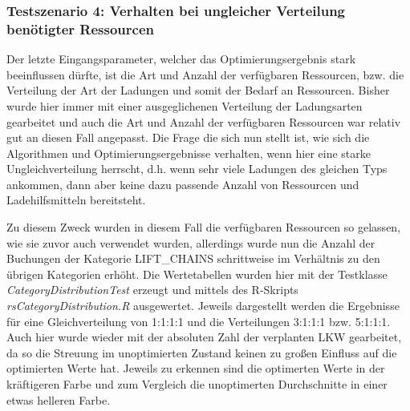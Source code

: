 \subsubsection{Testszenario 4: Verhalten bei ungleicher Verteilung benötigter Ressourcen}

Der letzte Eingangsparameter, welcher das Optimierungsergebnis stark beeinflussen dürfte, ist die Art und Anzahl der verfügbaren Ressourcen, bzw. die Verteilung der Art der Ladungen und somit der Bedarf an Ressourcen. Bisher wurde hier immer mit einer ausgeglichenen Verteilung der Ladungsarten gearbeitet und auch die Art und Anzahl der verfügbaren Ressourcen war relativ gut an diesen Fall angepasst. Die Frage die sich nun stellt ist, wie sich die Algorithmen und Optimierungsergebnisse verhalten, wenn hier eine starke Ungleichverteilung herrscht, d.h. wenn sehr viele Ladungen des gleichen Typs ankommen, dann aber keine dazu passende Anzahl von Ressourcen und Ladehilfsmitteln bereitsteht. 

Zu diesem Zweck wurden in diesem Fall die verfügbaren Ressourcen so gelassen, wie sie zuvor auch verwendet wurden, allerdings wurde nun die Anzahl der Buchungen der Kategorie LIFT\_CHAINS schrittweise im Verhältnis zu den übrigen Kategorien erhöht. Die Wertetabellen wurden hier mit der Testklasse \textit{CategoryDistributionTest} erzeugt und mittels des R-Skripts \textit{rsCategoryDistribution.R}  ausgewertet. Jeweils dargestellt werden die Ergebnisse für eine Gleichverteilung von 1:1:1:1 und die Verteilungen 3:1:1:1 bzw. 5:1:1:1. Auch hier wurde wieder mit der absoluten Zahl der verplanten LKW gearbeitet, da so die Streuung im unoptimierten Zustand keinen zu großen Einfluss auf die optimierten Werte hat. Jeweils zu erkennen sind die optimerten Werte in der kräftigeren Farbe und zum Vergleich die unoptimerten Durchschnitte in einer etwas helleren Farbe.


